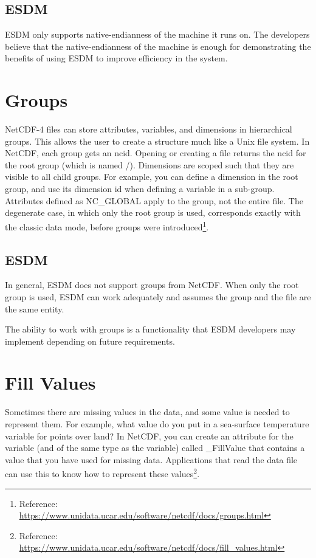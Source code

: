 \subsection{ESDM}


ESDM only supports native-endianness of the machine it runs on. The developers believe that the native-endianness of the machine is enough for demonstrating the benefits of using ESDM to improve efficiency in the system.

\section{Groups}


NetCDF-4 files can store attributes, variables, and dimensions in hierarchical groups. This allows the user to create a structure much like a Unix file system. In NetCDF, each group gets an ncid. Opening or creating a file returns the ncid for the root group (which is named /). Dimensions are scoped such that they are visible to all child groups. For example, you can define a dimension in the root group, and use its dimension id when defining a variable in a sub-group. Attributes defined as NC\_GLOBAL apply to the group, not the entire file. The degenerate case, in which only the root group is used, corresponds exactly with the classic data mode, before groups were introduced\footnote{Reference: \url{https://www.unidata.ucar.edu/software/netcdf/docs/groups.html}}.

\subsection{ESDM}


In general, ESDM does not support groups from NetCDF. When only the root group is used, ESDM can work adequately and assumes the group and the file are the same entity.

The ability to work with groups is a functionality that ESDM developers may implement depending on future requirements.

\section{Fill Values}


Sometimes there are missing values in the data, and some value is needed to represent them. For example, what value do you put in a sea-surface temperature variable for points over land? In NetCDF, you can create an attribute for the variable (and of the same type as the variable) called \_FillValue that contains a value that you have used for missing data. Applications that read the data file can use this to know how to represent these values\footnote{Reference: \url{https://www.unidata.ucar.edu/software/netcdf/docs/fill_values.html}}.

